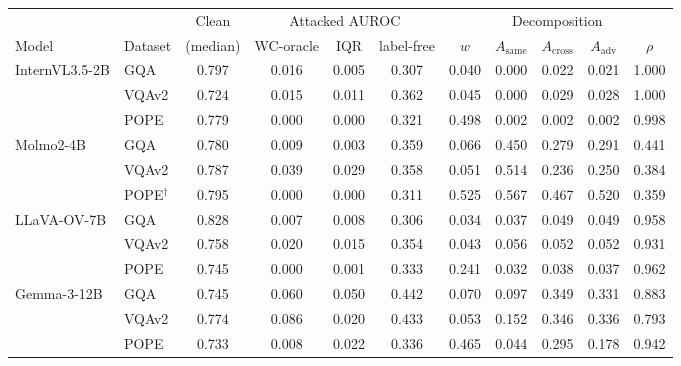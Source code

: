 \small
\setlength{\tabcolsep}{4pt}
\begin{tabular}{llcccc@{\hspace{8pt}}ccccc}
\toprule
 & & Clean & \multicolumn{3}{c}{Attacked AUROC} & \multicolumn{5}{c}{Decomposition} \\
\cmidrule(lr){4-6}\cmidrule(lr){7-11}
Model & Dataset & (median) & WC-oracle & IQR & label-free & $w$ & $A_{\mathrm{same}}$ & $A_{\mathrm{cross}}$ & $A_{\mathrm{adv}}$ & $\rho$ \\
\midrule
\multirow{3}{*}{InternVL3.5-2B} & GQA & 0.797 & 0.016 & 0.005 & 0.307 & 0.040 & 0.000 & 0.022 & 0.021 & 1.000 \\
 & VQAv2 & 0.724 & 0.015 & 0.011 & 0.362 & 0.045 & 0.000 & 0.029 & 0.028 & 1.000 \\
 & POPE & 0.779 & 0.000 & 0.000 & 0.321 & 0.498 & 0.002 & 0.002 & 0.002 & 0.998 \\
\midrule
\multirow{3}{*}{Molmo2-4B} & GQA & 0.780 & 0.009 & 0.003 & 0.359 & 0.066 & 0.450 & 0.279 & 0.291 & 0.441 \\
 & VQAv2 & 0.787 & 0.039 & 0.029 & 0.358 & 0.051 & 0.514 & 0.236 & 0.250 & 0.384 \\
 & POPE$^{\dagger}$\, & 0.795 & 0.000 & 0.000 & 0.311 & 0.525 & 0.567 & 0.467 & 0.520 & 0.359 \\
\midrule
\multirow{3}{*}{LLaVA-OV-7B} & GQA & 0.828 & 0.007 & 0.008 & 0.306 & 0.034 & 0.037 & 0.049 & 0.049 & 0.958 \\
 & VQAv2 & 0.758 & 0.020 & 0.015 & 0.354 & 0.043 & 0.056 & 0.052 & 0.052 & 0.931 \\
 & POPE & 0.745 & 0.000 & 0.001 & 0.333 & 0.241 & 0.032 & 0.038 & 0.037 & 0.962 \\
\midrule
\multirow{3}{*}{Gemma-3-12B} & GQA & 0.745 & 0.060 & 0.050 & 0.442 & 0.070 & 0.097 & 0.349 & 0.331 & 0.883 \\
 & VQAv2 & 0.774 & 0.086 & 0.020 & 0.433 & 0.053 & 0.152 & 0.346 & 0.336 & 0.793 \\
 & POPE & 0.733 & 0.008 & 0.022 & 0.336 & 0.465 & 0.044 & 0.295 & 0.178 & 0.942 \\
\bottomrule
\end{tabular}

